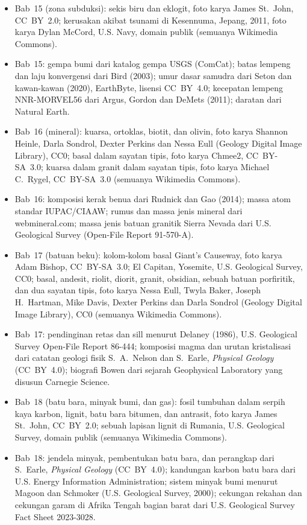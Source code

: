 \begin{itemize}
  \item Bab~15 (zona subduksi): sekis biru dan eklogit, foto karya James St.~John, CC~BY~2.0; kerusakan akibat tsunami di Kesennuma, Jepang, 2011, foto karya Dylan McCord, U.S. Navy, domain publik (semuanya Wikimedia Commons).
  \item Bab~15: gempa bumi dari katalog gempa USGS (ComCat); batas lempeng dan laju konvergensi dari Bird (2003); umur dasar samudra dari Seton dan kawan-kawan (2020), EarthByte, lisensi CC~BY~4.0; kecepatan lempeng NNR-MORVEL56 dari Argus, Gordon dan DeMets (2011); daratan dari Natural Earth.
  \item Bab~16 (mineral): kuarsa, ortoklas, biotit, dan olivin, foto karya Shannon Heinle, Darla Sondrol, Dexter Perkins dan Nessa Eull (Geology Digital Image Library), CC0; basal dalam sayatan tipis, foto karya Chmee2, CC~BY-SA~3.0; kuarsa dalam granit dalam sayatan tipis, foto karya Michael C.~Rygel, CC~BY-SA~3.0 (semuanya Wikimedia Commons).
  \item Bab~16: komposisi kerak benua dari Rudnick dan Gao (2014); massa atom standar IUPAC/CIAAW; rumus dan massa jenis mineral dari webmineral.com; massa jenis batuan granitik Sierra Nevada dari U.S. Geological Survey (Open-File Report 91-570-A).
  \item Bab~17 (batuan beku): kolom-kolom basal Giant's Causeway, foto karya Adam Bishop, CC~BY-SA~3.0; El Capitan, Yosemite, U.S. Geological Survey, CC0; basal, andesit, riolit, diorit, granit, obsidian, sebuah batuan porfiritik, dan dua sayatan tipis, foto karya Nessa Eull, Twyla Baker, Joseph H.~Hartman, Mike Davis, Dexter Perkins dan Darla Sondrol (Geology Digital Image Library), CC0 (semuanya Wikimedia Commons).
  \item Bab~17: pendinginan retas dan sill menurut Delaney (1986), U.S. Geological Survey Open-File Report 86-444; komposisi magma dan urutan kristalisasi dari catatan geologi fisik S.~A.~Nelson dan S.~Earle, \emph{Physical Geology} (CC~BY~4.0); biografi Bowen dari sejarah Geophysical Laboratory yang disusun Carnegie Science.
  \item Bab~18 (batu bara, minyak bumi, dan gas): fosil tumbuhan dalam serpih kaya karbon, lignit, batu bara bitumen, dan antrasit, foto karya James St.~John, CC~BY~2.0; sebuah lapisan lignit di Rumania, U.S. Geological Survey, domain publik (semuanya Wikimedia Commons).
  \item Bab~18: jendela minyak, pembentukan batu bara, dan perangkap dari S.~Earle, \emph{Physical Geology} (CC~BY~4.0); kandungan karbon batu bara dari U.S. Energy Information Administration; sistem minyak bumi menurut Magoon dan Schmoker (U.S. Geological Survey, 2000); cekungan rekahan dan cekungan garam di Afrika Tengah bagian barat dari U.S. Geological Survey Fact Sheet 2023-3028.

\end{itemize}
